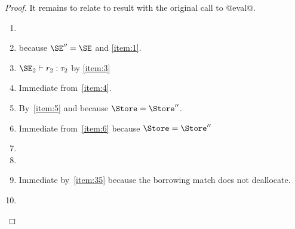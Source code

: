 \begin{proof}
  It remains to relate to result with the original call to @eval@.
  \begin{enumerate}[(R1)]
  \item {}
  \item {} because $\SE'' = \SE$ and \ref{item:1}.
  \item $\SE_2 \vdash r_2 : \tau_2$ by \ref{item:3}
  \item {}
    Immediate from~\ref{item:4}.
  \item {} By~\ref{item:5} and because $\Store =\Store''$.
  \item {} Immediate from~\ref{item:6} because
    $\Store = \Store''$
  \item {}
  \item {}
  \item {}
    Immediate by~\ref{item:35} because the borrowing match does not deallocate.
  \item {}
  \end{enumerate}

\end{proof}

